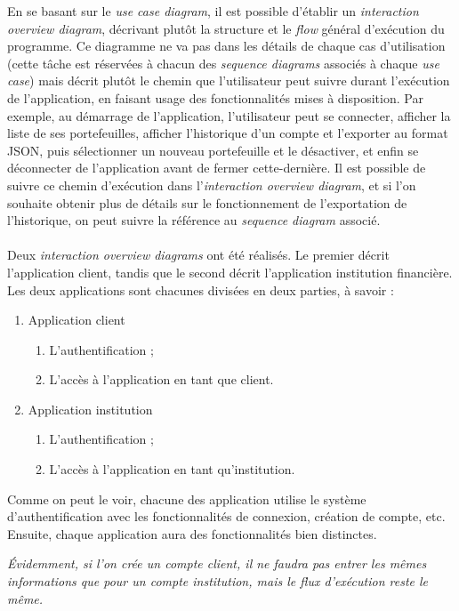 En se basant sur le \emph{use case diagram}, il est possible d'établir un \emph{interaction overview diagram}, décrivant plutôt la structure et le \emph{flow} général d'exécution du programme. Ce diagramme ne va pas dans les détails de chaque cas d'utilisation (cette tâche est réservées à chacun des \emph{sequence diagrams} associés à chaque \emph{use case}) mais décrit plutôt le chemin que l'utilisateur peut suivre durant l'exécution de l'application, en faisant usage des fonctionnalités mises à disposition. Par exemple, au démarrage de l'application, l'utilisateur peut se connecter, afficher la liste de ses portefeuilles, afficher l'historique d'un compte et l'exporter au format JSON, puis sélectionner un nouveau portefeuille et le désactiver, et enfin se déconnecter de l'application avant de fermer cette-dernière. Il est possible de suivre ce chemin d'exécution dans l'\emph{interaction overview diagram}, et si l'on souhaite obtenir plus de détails sur le fonctionnement de l'exportation de l'historique, on peut suivre la référence au \emph{sequence diagram} associé.
\\
\\
\indent Deux \emph{interaction overview diagrams} ont été réalisés. Le premier décrit l'application client, tandis que le second décrit l'application institution financière. Les deux applications sont chacunes divisées en deux parties, à savoir :
\begin{enumerate}
\item Application client
\begin{enumerate}
\item L'authentification ;
\item L'accès à l'application en tant que client.
\end{enumerate}
\item  Application institution
\begin{enumerate}
\item L'authentification ;
\item L'accès à l'application en tant qu'institution.
\end{enumerate}
\end{enumerate}
Comme on peut le voir, chacune des application utilise le système d'authentification avec les fonctionnalités de connexion, création de compte, etc. Ensuite, chaque application aura des fonctionnalités bien distinctes.
\begin{footnotesize}
\indent \textit{Évidemment, si l'on crée un compte client, il ne faudra pas entrer les mêmes informations que pour un compte institution, mais le flux d'exécution reste le même.}
\end{footnotesize}


